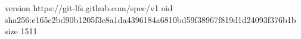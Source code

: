 version https://git-lfs.github.com/spec/v1
oid sha256:e165e2bd90b1205f3e8a1da4396184a6810bd59f38967f819d1d24093f376b1b
size 1511
